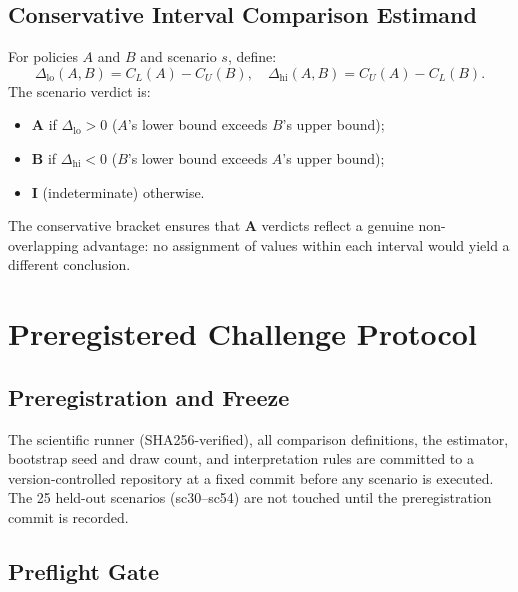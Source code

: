 \documentclass[acmsmall,screen,review,anonymous]{acmart}
\newcommand{\dlo}{\ensuremath{\Delta_{\mathrm{lo}}}\xspace}
\newcommand{\dhi}{\ensuremath{\Delta_{\mathrm{hi}}}\xspace}
\begin{document}

\subsection{Conservative Interval Comparison Estimand}

For policies $A$ and $B$ and scenario $s$, define:
\begin{equation}
  \dlo(A,B) = C_L(A) - C_U(B), \quad
  \dhi(A,B) = C_U(A) - C_L(B).
\end{equation}
The scenario verdict is:
\begin{itemize}
  \item \textbf{A} if $\dlo > 0$ ($A$'s lower bound exceeds $B$'s upper bound);
  \item \textbf{B} if $\dhi < 0$ ($B$'s lower bound exceeds $A$'s upper bound);
  \item \textbf{I} (indeterminate) otherwise.
\end{itemize}
The conservative bracket ensures that \textbf{A} verdicts reflect a genuine non-overlapping
advantage: no assignment of values within each interval would yield a different conclusion.

\section{Preregistered Challenge Protocol}
\label{sec:protocol}

\subsection{Preregistration and Freeze}

The scientific runner (SHA256-verified), all comparison definitions, the estimator,
bootstrap seed and draw count, and interpretation rules are committed to a version-controlled
repository at a fixed commit before any scenario is executed.  The 25 held-out scenarios
(sc30--sc54) are not touched until the preregistration commit is recorded.

\subsection{Preflight Gate}
\end{document}

